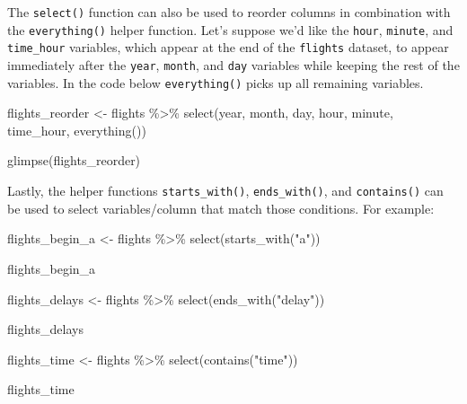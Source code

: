 \documentclass[
  letterpaper,
  DIV=11,
  numbers=noendperiod]{scrreprt}
\newenvironment{Shaded}{\begin{snugshade}}{\end{snugshade}}
\newcommand{\FunctionTok}[1]{\textcolor[rgb]{0.28,0.35,0.67}{#1}}
\newcommand{\NormalTok}[1]{\textcolor[rgb]{0.00,0.23,0.31}{#1}}
\newcommand{\OtherTok}[1]{\textcolor[rgb]{0.00,0.23,0.31}{#1}}
\newcommand{\SpecialCharTok}[1]{\textcolor[rgb]{0.37,0.37,0.37}{#1}}
\newcommand{\StringTok}[1]{\textcolor[rgb]{0.13,0.47,0.30}{#1}}
\theoremstyle{definition}
\theoremstyle{remark}
\begin{document}
The \texttt{select()} function can also be used to reorder columns in
combination with the \texttt{everything()} helper function. Let's
suppose we'd like the \texttt{hour}, \texttt{minute}, and
\texttt{time\_hour} variables, which appear at the end of the
\texttt{flights} dataset, to appear immediately after the \texttt{year},
\texttt{month}, and \texttt{day} variables while keeping the rest of the
variables. In the code below \texttt{everything()} picks up all
remaining variables.

\begin{Shaded}
\begin{Highlighting}[]
\NormalTok{flights\_reorder }\OtherTok{\textless{}{-}}\NormalTok{ flights }\SpecialCharTok{\%\textgreater{}\%} 
  \FunctionTok{select}\NormalTok{(year, month, day, hour, minute, time\_hour, }\FunctionTok{everything}\NormalTok{())}

\FunctionTok{glimpse}\NormalTok{(flights\_reorder)}
\end{Highlighting}
\end{Shaded}

Lastly, the helper functions \texttt{starts\_with()},
\texttt{ends\_with()}, and \texttt{contains()} can be used to select
variables/column that match those conditions. For example:

\begin{Shaded}
\begin{Highlighting}[]
\NormalTok{flights\_begin\_a }\OtherTok{\textless{}{-}}\NormalTok{ flights }\SpecialCharTok{\%\textgreater{}\%} 
  \FunctionTok{select}\NormalTok{(}\FunctionTok{starts\_with}\NormalTok{(}\StringTok{"a"}\NormalTok{))}

\NormalTok{flights\_begin\_a}
\end{Highlighting}
\end{Shaded}

\begin{Shaded}
\begin{Highlighting}[]
\NormalTok{flights\_delays }\OtherTok{\textless{}{-}}\NormalTok{ flights }\SpecialCharTok{\%\textgreater{}\%} 
  \FunctionTok{select}\NormalTok{(}\FunctionTok{ends\_with}\NormalTok{(}\StringTok{"delay"}\NormalTok{))}

\NormalTok{flights\_delays}
\end{Highlighting}
\end{Shaded}

\begin{Shaded}
\begin{Highlighting}[]
\NormalTok{flights\_time }\OtherTok{\textless{}{-}}\NormalTok{ flights }\SpecialCharTok{\%\textgreater{}\%} 
  \FunctionTok{select}\NormalTok{(}\FunctionTok{contains}\NormalTok{(}\StringTok{"time"}\NormalTok{))}

\NormalTok{flights\_time}
\end{Highlighting}
\end{Shaded}
\end{document}
